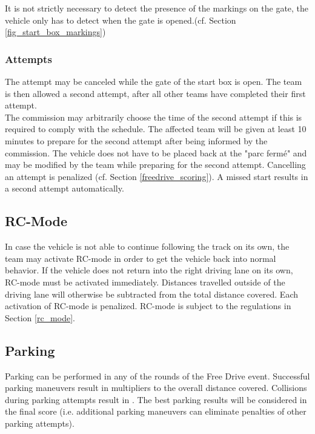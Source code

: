 It is not strictly necessary to detect the presence of the markings on the
gate, the vehicle only has to detect when the gate is opened.(cf. Section
\ref{fig_start_box_markings})

\subsubsection{Attempts}

The attempt may be canceled while the gate of the start box is open. The team
is then allowed a second attempt, after all other teams have completed their
first attempt.\\ The commission may arbitrarily choose the time of the second
attempt if this is required to comply with the schedule. The affected team will
be given at least 10 minutes to prepare for the second attempt after being
informed by the commission. The vehicle does not have to be placed back at the
"parc fermé" and may be modified by the team while preparing for the second
attempt. Cancelling an attempt is penalized (cf. Section
\ref{freedrive_scoring}). A missed start results in a second attempt
automatically.

\subsection{RC-Mode}

In case the vehicle is not able to continue following the track on its own, the
team may activate RC-mode in order to get the vehicle back into normal
behavior. If the vehicle does not return into the right driving lane on its
own, RC-mode must be activated immediately. Distances travelled outside of the
driving lane will otherwise be subtracted from the total distance covered. Each
activation of RC-mode is penalized. RC-mode is subject to the regulations in
Section \ref{rc_mode}.

\subsection{Parking}

Parking can be performed in any of the rounds of the Free Drive event.
Successful parking maneuvers result in multipliers to the overall distance
covered. Collisions during parking attempts result in . The best parking results will be considered 
in the final score (i.e. additional parking maneuvers can eliminate penalties of 
other parking attempts).

